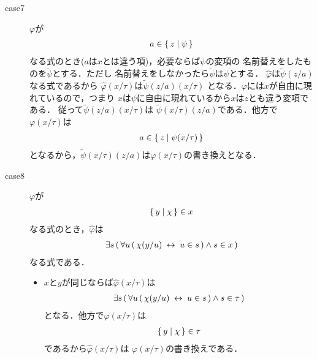 \begin{metaprf}
\begin{description}
\begin{description}
					\item[case7] $\varphi$が
						\begin{align}
							a \in \{\, z \mid \psi\, \}
						\end{align}
						なる式のとき($a$は$x$とは違う項)，必要ならば$\psi$の変項の
						名前替えをしたものを$\widetilde{\psi}$とする．ただし
						名前替えをしなかったら$\widetilde{\psi}$は$\psi$とする．
						$\widehat{\varphi}$は$\widetilde{\psi}(z/a)$なる式であるから
						$\widehat{\varphi}(x/\tau)$は$\widetilde{\psi}(z/a)(x/\tau)$
						となる．$\varphi$には$x$が自由に現れているので，つまり
						$x$は$\psi$に自由に現れているから$x$は$z$とも違う変項である．
						従って$\widetilde{\psi}(z/a)(x/\tau)$は
						$\widetilde{\psi}(x/\tau)(z/a)$である．他方で
						$\varphi(x/\tau)$は
						\begin{align}
							a \in \{\, z \mid \psi(x/\tau)\, \}
						\end{align}
						となるから，$\widetilde{\psi}(x/\tau)(z/a)$は$\varphi(x/\tau)$の書き換えとなる．
					
					\item[case8] $\varphi$が
						\begin{align}
							\{\, y \mid \chi\, \} \in x
						\end{align}
						なる式のとき，$\widehat{\varphi}$は
						\begin{align}
							\exists s\, (\, \forall u\, (\, \chi(y/u) \hspace{0.25em}\leftrightarrow\hspace{0.25em} u \in s\, ) \wedge s \in x\, )
						\end{align}
						なる式である．
						\begin{itemize}
							\item $x$と$y$が同じならば$\widehat{\varphi}(x/\tau)$は
								\begin{align}
									\exists s\, (\, \forall u\, (\, \chi(y/u) \hspace{0.25em}\leftrightarrow\hspace{0.25em} u \in s\, ) \wedge s \in \tau\, )
								\end{align}
								となる．他方で$\varphi(x/\tau)$は
								\begin{align}
									\{\, y \mid \chi\, \} \in \tau
								\end{align}
								であるから$\widehat{\varphi}(x/\tau)$は
								$\varphi(x/\tau)$の書き換えである．
								

\end{itemize}
\end{description}
\end{description}
\end{metaprf}
